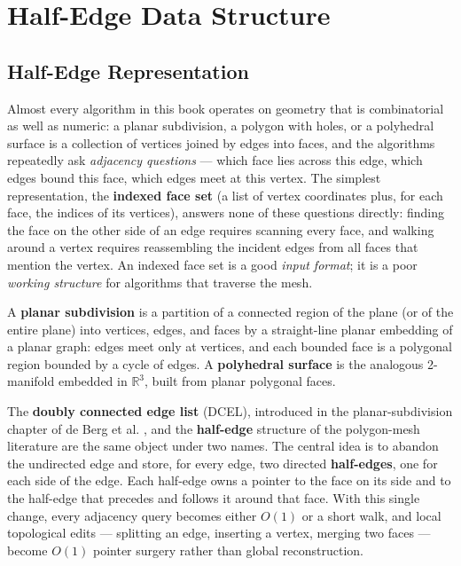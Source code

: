 \chapter{Half-Edge Data Structure}
\label{ch:half_edge}

\section{Half-Edge Representation}
\label{sec:halfedge_representation}

Almost every algorithm in this book operates on geometry that is
combinatorial as well as numeric: a planar subdivision, a polygon with
holes, or a polyhedral surface is a collection of vertices joined by edges
into faces, and the algorithms repeatedly ask \emph{adjacency questions}
--- which face lies across this edge, which edges bound this face, which
edges meet at this vertex. The simplest representation, the
\textbf{indexed face set} (a list of vertex
coordinates plus, for each face, the indices of its vertices), answers none
of these questions directly: finding the face on the other side of an edge
requires scanning every face, and walking around a vertex requires
reassembling the incident edges from all faces that mention the vertex. An
indexed face set is a good \emph{input format}; it is a poor
\emph{working structure} for algorithms that traverse the mesh.

\begin{definition}\label{def:hed_subdivision}
A \textbf{planar subdivision} is a partition of a connected region of the
plane (or of the entire plane) into vertices, edges, and faces by a
straight-line planar embedding of a planar graph: edges meet only at
vertices, and each bounded face is a polygonal region bounded by a cycle of
edges. A \textbf{polyhedral surface} is the analogous 2-manifold embedded
in $\mathbb{R}^3$, built from planar polygonal faces.
\end{definition}

The \textbf{doubly connected edge list}
(DCEL), introduced in the planar-subdivision chapter of de Berg et al.
\cite{deberg2008}, and the \textbf{half-edge} structure of
the polygon-mesh literature \cite{botsch2010} are the same object under two
names. The central idea is to abandon the undirected edge and store, for
every edge, two directed \textbf{half-edges}, one for each
side of the edge. Each half-edge owns a pointer to the face on its side and
to the half-edge that precedes and follows it around that face. With this
single change, every adjacency query becomes either $O(1)$ or a short walk,
and local topological edits --- splitting an edge, inserting a vertex,
merging two faces --- become $O(1)$ pointer surgery rather than global
reconstruction.

